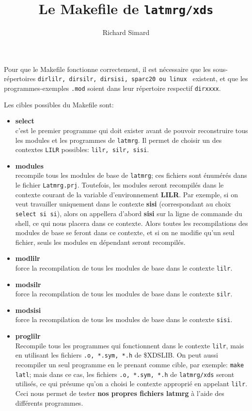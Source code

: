 \documentclass[11pt]{article}
\title{Le Makefile de {\tt latmrg/xds}}
\author{Richard Simard}
\begin{document}
\maketitle
Pour que le Makefile fonctionne correctement, il est n\'ecessaire que 
les sous-r\'epertoires 
{\tt dirlilr, dirsilr, dirsisi, sparc20 ou linux }
existent, et que les programmes-ex\-em\-ples {\tt *.mod} 
soient dans leur r\'epertoire respectif {\tt dirxxxx}.

Les cibles possibles du Makefile sont:

\begin{itemize}
\item{\bf select} \\
c'est le premier programme qui doit exister avant de pouvoir 
reconstruire tous les modules et les programmes de {\tt latmrg}.
Il permet de choisir un des contextes {\tt LILR} possibles:
{\tt lilr, silr, sisi}. 

\item{\bf modules} \\
recompile tous les modules de base de {\tt latmrg}; ces fichiers
sont \'enum\'er\'es dans le fichier {\tt Latmrg.prj}. Toutefois,
les modules seront recompil\'es dans le contexte  courant de la variable
d'environnement {\bf LILR}. Par exemple, si on veut 
travailler uniquement dans le contexte {\bf sisi} (correspondant
au choix {\tt select si si}), alors on appellera d'abord {\bf sisi}
sur la ligne de commande du shell, ce qui nous placera dans ce contexte.
Alors toutes les recompilations des modules de base se feront 
dans ce contexte, et si on ne modifie qu'un seul fichier, seuls
les modules en d\'ependant seront recompil\'es.

\item{\bf modlilr} \\
force la recompilation de tous les modules de base dans le
contexte  {\tt lilr}.

\item{\bf modsilr} \\
force la recompilation de tous les modules de base dans le
contexte {\tt silr}.

\item{\bf modsisi} \\
force la recompilation de tous les modules de base dans le
contexte {\tt sisi}.

\item{\bf proglilr} \\
Recompile tous les programmes qui fonctionnent dans le contexte 
{\tt lilr}, mais en utilisant les fichiers {\tt *.o, *.sym, *.h}
de {\$XDSLIB}. %
 On peut aussi recompiler un seul programme en 
le prenant comme cible, par exemple: {\tt make latl};
 mais dans ce cas, les fichiers  {\tt *.o, *.sym, *.h} de
{\tt latmrg/xds} seront utilis\'es, ce qui pr\'esume qu'on a
choisi le contexte appropri\'e en appelant {\tt lilr}. 
Ceci nous permet de tester {\bf nos propres fichiers  latmrg} 
\`a l'aide des diff\'erents programmes.


\end{itemize}
\end{document}
